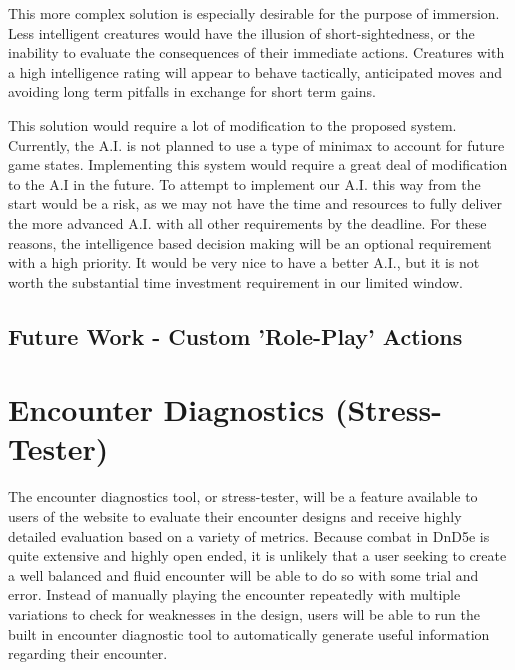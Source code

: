 \documentclass[12pt,a4paper]{report}
\begin{document}
		
		This more complex solution is especially desirable for the purpose of immersion. Less intelligent creatures would have the illusion of short-sightedness, or the inability to evaluate the consequences of their immediate actions. Creatures with a high intelligence rating will appear to behave tactically, anticipated moves and avoiding long term pitfalls in exchange for short term gains. 
		
		This solution would require a lot of modification to the proposed system. Currently, the A.I. is not planned to use a type of minimax to account for future game states. Implementing this system would require a great deal of modification to the A.I in the future. To attempt to implement our A.I. this way from the start would be a risk, as we may not have the time and resources to fully deliver the more advanced A.I. with all other requirements by the deadline. For these reasons, the intelligence based decision making will be an optional requirement with a high priority. It would be very nice to have a better A.I., but it is not worth the substantial time investment requirement in our limited window. 
		
		
		\subsection{Future Work - Custom 'Role-Play' Actions}
		
		
	\newpage
	\section{Encounter Diagnostics (Stress-Tester)}
	The encounter diagnostics tool, or stress-tester, will be a feature available to users of the website to evaluate their encounter designs and receive highly detailed evaluation based on a variety of metrics. Because combat in DnD5e is quite extensive and highly open ended, it is unlikely that a user seeking to create a well balanced and fluid encounter will be able to do so with some trial and error. Instead of manually playing the encounter repeatedly with multiple variations to check for weaknesses in the design, users will be able to run the built in encounter diagnostic tool to automatically generate useful information regarding their encounter. 
	
\end{document}
